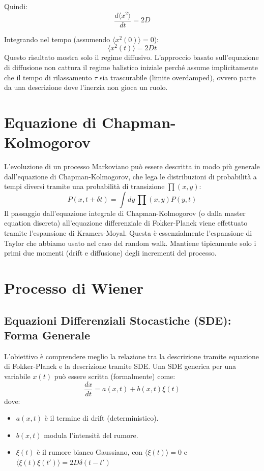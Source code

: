 Quindi:
\begin{equation}
\frac{d \langle x^2 \rangle}{dt} = 2D
\end{equation}

Integrando nel tempo (assumendo $\langle x^2(0) \rangle = 0$):
\begin{equation}
\langle x^2(t) \rangle = 2Dt
\end{equation}
Questo risultato mostra solo il regime diffusivo. L'approccio basato sull'equazione di diffusione non cattura il regime balistico iniziale perché assume implicitamente che il tempo di rilassamento $\tau$ sia trascurabile (limite overdamped), ovvero parte da una descrizione dove l'inerzia non gioca un ruolo.

\section{Equazione di Chapman-Kolmogorov}
L'evoluzione di un processo Markoviano può essere descritta in modo più generale dall'equazione di Chapman-Kolmogorov, che lega le distribuzioni di probabilità a tempi diversi tramite una probabilità di transizione $\prod (x,y)$:
\begin{equation}
P(x, t+\delta t) = \int dy \, \prod (x,y) P(y, t)
\end{equation}
Il passaggio dall'equazione integrale di Chapman-Kolmogorov (o dalla master equation discreta) all'equazione differenziale di Fokker-Planck viene effettuato tramite l'espansione di Kramers-Moyal. Questa è essenzialmente l'espansione di Taylor che abbiamo usato nel caso del random walk. Mantiene tipicamente solo i primi due momenti (drift e diffusione) degli incrementi del processo.

\section{Processo di Wiener}

\subsection{Equazioni Differenziali Stocastiche (SDE): Forma Generale}
L'obiettivo è comprendere meglio la relazione tra la descrizione tramite equazione di Fokker-Planck e la descrizione tramite SDE.
Una SDE generica per una variabile $x(t)$ può essere scritta (formalmente) come:
\begin{equation}
\label{eq:sde_generale}
\frac{dx}{dt} = a(x,t) + b(x,t) \xi(t)
\end{equation}
dove:
\begin{itemize}
    \item $a(x,t)$ è il termine di drift (deterministico).
    \item $b(x,t)$ modula l'intensità del rumore.
    \item $\xi(t)$ è il rumore bianco Gaussiano, con $\langle \xi(t) \rangle = 0$ e $\langle \xi(t) \xi(t') \rangle = 2D \delta(t-t')$
\end{itemize}

